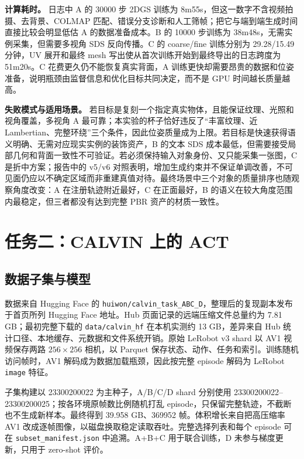 \documentclass[letterpaper,times,10pt,twocolumn]{article}
\begin{document}
\textbf{计算耗时。}
日志中 A 的 30000 步 2DGS 训练为 8m55s，但这一数字不含视频拍摄、去背景、COLMAP 匹配、错误分支诊断和人工筛帧；把它与端到端生成时间直接比较会明显低估 A 的数据准备成本。B 的 10000 步训练为 38m48s，无需实例采集，但需要多视角 SDS 反向传播。C 的 coarse/fine 训练分别为 29.28/15.49 分钟，UV 展开和最终 mesh 写出使从首次训练开始到最终导出的日志跨度为 51m20s。C 花费更久仍不能恢复真实背面，A 训练更快却需要昂贵的数据和位姿准备，说明瓶颈由监督信息和优化目标共同决定，而不是 GPU 时间越长质量越高。

\textbf{失败模式与适用场景。}
若目标是复刻一个指定真实物体，且能保证纹理、光照和视角覆盖，多视角 A 最可靠；本实验的杯子恰好违反了“丰富纹理、近 Lambertian、完整环绕”三个条件，因此位姿质量成为上限。若目标是快速获得语义明确、无需对应现实实例的装饰资产，B 的文本 SDS 成本最低，但需要接受局部几何和背面一致性不可验证。若必须保持输入对象身份、又只能采集一张图，C 是折中方案；报告中的 v5/v6 对照表明，增加生成约束并不保证单调改善，不可见面仍应以不确定区域而非重建真值对待。最终场景中三个对象的质量排序也随观察角度改变：A 在注册轨迹附近最好，C 在正面最好，B 的语义在较大角度范围内最稳定，但三者都没有达到完整 PBR 资产的材质一致性。

\section{任务二：CALVIN 上的 ACT}

\subsection{数据子集与模型}

数据来自 Hugging Face 的 \texttt{huiwon/calvin\_task\_ABC\_D}，整理后的复现副本发布于首页所列 Hugging Face 地址。Hub 页面记录的远端压缩文件总量约为 7.81 GB；最初完整下载的 \texttt{data/calvin\_hf} 在本机实测约 13 GB，差异来自 Hub 统计口径、本地缓存、元数据和文件系统开销。原始 LeRobot v3 shard 以 AV1 视频保存两路 $256\times256$ 相机，以 Parquet 保存状态、动作、任务和索引。训练随机访问帧时，AV1 解码成为数据加载瓶颈，因此按完整 episode 解码为 LeRobot \texttt{image} 特征。

子集构建以 23300200022 为主种子，A/B/C/D shard 分别使用 23300200022--23300200025；按各环境原帧数比例随机打乱 episode，只保留完整轨迹，不截断也不生成新样本。最终得到 39.958 GB、369952 帧。体积增长来自把高压缩率 AV1 改成逐帧图像，以磁盘换取稳定读取吞吐。完整选择列表和每个 episode 可在 \texttt{subset\_manifest.json} 中追溯。A+B+C 用于联合训练，D 未参与梯度更新，只用于 zero-shot 评价。
\end{document}

